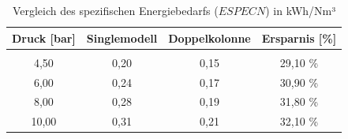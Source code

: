 \begin{table}[htbp]
\centering
\caption{Vergleich des spezifischen Energiebedarfs ($ESPECN$) in kWh/Nm³}
\label{tab:vergleich_power_penalty}
\begin{tabular}{cccc}
\hline
\textbf{Druck [bar]} & \textbf{Singlemodell} & \textbf{Doppelkolonne} & \textbf{Ersparnis [\%]} \\ \hline \\
4,50 & 0,20 & 0,15 & 29,10 \% \\
6,00 & 0,24 & 0,17 & 30,90 \% \\
8,00 & 0,28 & 0,19 & 31,80 \% \\
10,00 & 0,31 & 0,21 & 32,10 \%  \hline \\
\end{tabular}
\end{table}
